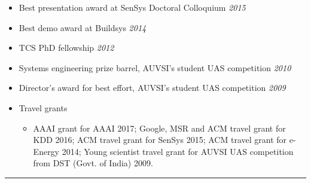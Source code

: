 \documentclass[letter,10pt]{article}
\begin{document}
\begin{itemize}
    \item[]{Best presentation award at SenSys Doctoral Colloquium} \hfill\textit{2015}
    \item[]{Best demo award at Buildsys} \hfill\textit{2014}
    \item[]{TCS PhD fellowship} \hfill\textit{2012}
    \item[]{Systems engineering prize barrel, AUVSI's student UAS competition} \hfill\textit{2010}
    \item[]{Director's award for best effort, AUVSI's student UAS competition} \hfill\textit{2009}

    \item[] Travel grants
    \begin{itemize}
        \item[] AAAI grant for AAAI 2017; Google, MSR and ACM travel grant for KDD 2016; ACM travel grant for SenSys 2015; ACM travel grant for e-Energy 2014; Young scientist travel grant for AUVSI UAS competition from DST (Govt. of India) 2009.
    \end{itemize}
   
    
\end{itemize}

\ifcvshort\else
\vspace{0.5em}
\noindent\rule{\textwidth}{0.5pt}
\vspace{-0.2em}
\fi
\end{document}
